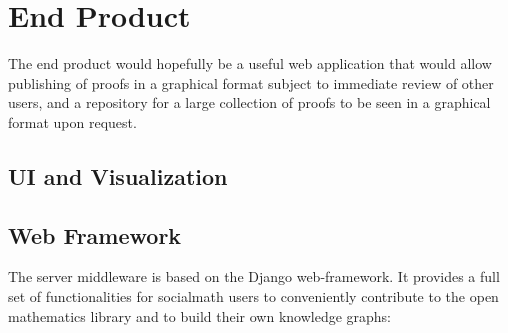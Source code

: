 \documentclass{acm_proc_article-sp}
\begin{document}
\section{End Product}
The end product would hopefully be a useful web application that would
allow publishing of proofs in a graphical format subject to immediate review
of other users, and a repository for a large collection of proofs to be
seen in a graphical format upon request.
\subsection{UI and Visualization}
\subsection{Web Framework}
The server middleware is based on the Django web-framework. It provides a full set of functionalities for socialmath users to conveniently contribute to the open mathematics library and to build their own knowledge graphs:
\end{document}
